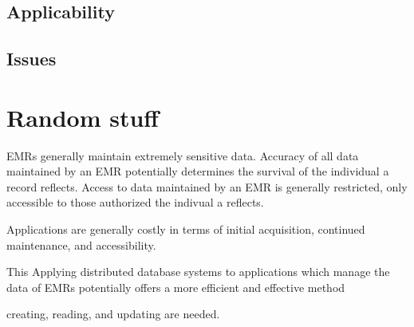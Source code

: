 \documentclass{acm_proc_article-sp}
\begin{document}
\subsection{Applicability}
\subsection{Issues}



\section{Random stuff}
EMRs generally maintain extremely sensitive data.  Accuracy of all data
maintained by an EMR potentially determines the survival of the individual a record 
reflects.  Access to data maintained by an EMR is generally restricted, only accessible 
to those authorized the indivual a reflects.

Applications are generally costly in terms of initial acquisition, continued maintenance, 
and accessibility.




This Applying distributed database systems to applications which manage the data of EMRs
potentially offers a more efficient and effective method 

creating, reading, and updating are needed.
\end{document}
